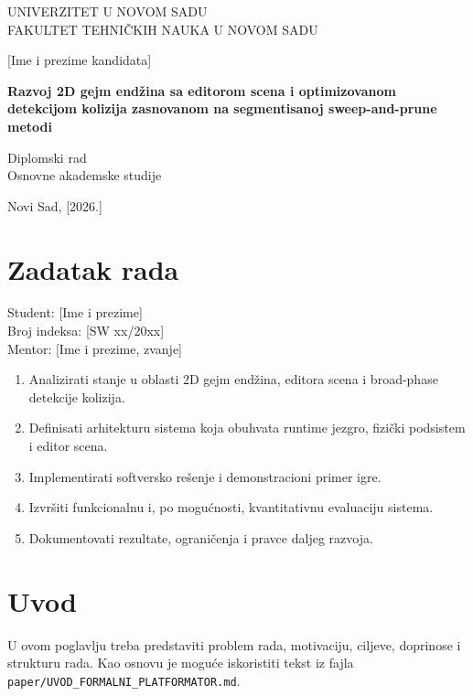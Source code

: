 \documentclass[12pt,a4paper]{report}
\begin{document}
\begin{titlepage}
\begin{center}
UNIVERZITET U NOVOM SADU \\
FAKULTET TEHNIČKIH NAUKA U NOVOM SADU

\vfill

{\Large [Ime i prezime kandidata]}

\vfill

{\Large \textbf{Razvoj 2D gejm endžina sa editorom scena i optimizovanom detekcijom kolizija zasnovanom na segmentisanoj sweep-and-prune metodi}}

\vfill

Diplomski rad \\
Osnovne akademske studije

\vfill

Novi Sad, [2026.]
\end{center}
\end{titlepage}

\chapter*{Zadatak rada}

Student: [Ime i prezime] \\
Broj indeksa: [SW xx/20xx] \\
Mentor: [Ime i prezime, zvanje]

\begin{enumerate}
  \item Analizirati stanje u oblasti 2D gejm endžina, editora scena i broad-phase detekcije kolizija.
  \item Definisati arhitekturu sistema koja obuhvata runtime jezgro, fizički podsistem i editor scena.
  \item Implementirati softversko rešenje i demonstracioni primer igre.
  \item Izvršiti funkcionalnu i, po mogućnosti, kvantitativnu evaluaciju sistema.
  \item Dokumentovati rezultate, ograničenja i pravce daljeg razvoja.
\end{enumerate}

\tableofcontents

\chapter{Uvod}

U ovom poglavlju treba predstaviti problem rada, motivaciju, ciljeve, doprinose i strukturu rada. Kao osnovu je moguće iskoristiti tekst iz fajla \texttt{paper/UVOD\_FORMALNI\_PLATFORMATOR.md}.
\end{document}
